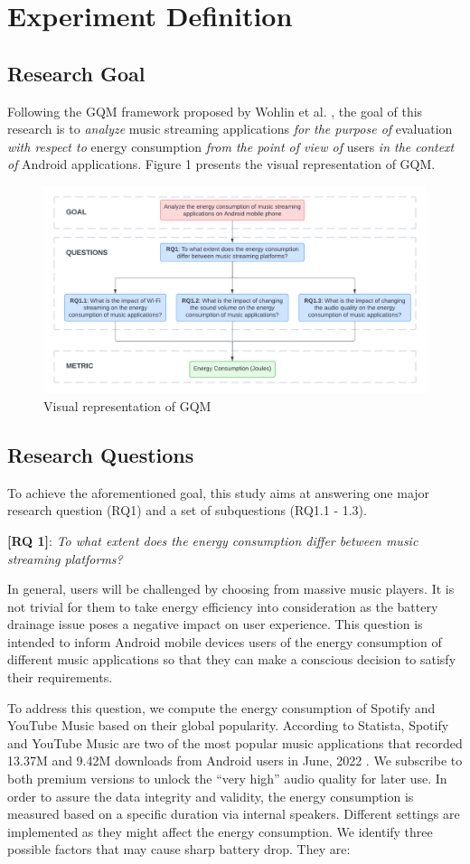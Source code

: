 \section{Experiment Definition}
\subsection{Research Goal}
Following the GQM framework proposed by Wohlin et al. \cite{wohlin2012experimentation}, the goal of this research is to \emph{analyze} music streaming applications \emph{for the purpose of} evaluation \emph{with respect to} energy consumption \emph{from the point of view of} users \emph{in the context of} Android applications. Figure 1 presents the visual representation of GQM. 
\begin{figure}[htbp]
 \centering
 \includegraphics[width=0.8\linewidth]{figures/Visual representation of GQM.png}\textcolor{blue}{\caption{{\color{blue}Visual representation of GQM}}}
\end{figure}
\subsection{Research Questions}
To achieve the aforementioned goal, this study aims at answering one major research question (RQ1) and a set of subquestions (RQ1.1 - 1.3).

\textbf{[RQ 1]}: \emph{To what extent does the energy consumption differ between music streaming platforms?}

In general, users will be challenged by choosing from massive music players. It is not trivial for them to take energy efficiency into consideration as the battery drainage issue poses a negative impact on user experience. This question is intended to inform Android mobile devices users of the energy consumption of different music applications so that they can make a conscious decision to satisfy their requirements. 

To address this question, we compute the energy consumption of Spotify and YouTube Music based on their global popularity. According to Statista, Spotify and YouTube Music are two of the most popular music applications that recorded 13.37M and 9.42M downloads from Android users in June, 2022 \cite{13}. We subscribe to both premium versions to unlock the “very high” audio quality for later use. In order to assure the data integrity and validity, the energy consumption is measured based on a specific duration via internal speakers. Different settings are implemented as they might affect the energy consumption. We identify three possible factors that may cause sharp battery drop. They are:

